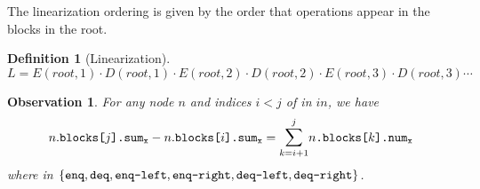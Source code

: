 \documentclass[10pt]{article}
\newcommand{\sub}[1]{\textsubscript{#1}}
\newcommand{\nf}[1]{{\normalfont{\texttt{#1}}}}
\newtheorem{observation}[theorem]{Observation}
\theoremstyle{definition}
\newtheorem{definition}[theorem]{Definition}
\begin{document}
The linearization ordering is given by the order that operations appear in the blocks in the root.
\begin{definition}[Linearization] \label{def::lin}
 $$L=E(root,1)\cdot D(root,1)\cdot E(root,2)\cdot D(root,2)\cdot E(root,3)\cdot D(root,3)\cdots$$
\end{definition}

\begin{observation}\label{sumToNum}
For any node $n$ and indices $i<j$ of \nf{blocks} in $in$, we have
$$n.\nf{blocks[}j\nf{].sum\sub{x}}-n.\nf{blocks[}i\nf{].sum\sub{x}}=\mathlarger{\sum}_{k=i+1}^{j}  n\nf{.blocks[}k\nf{].num\sub{x}}$$ where \nf{x} in $\{\nf{enq}, \nf{deq}, \nf{enq-left}, \nf{enq-right}, \nf{deq-left}, \nf{deq-right}\}$.
\end{observation}
\end{document}
